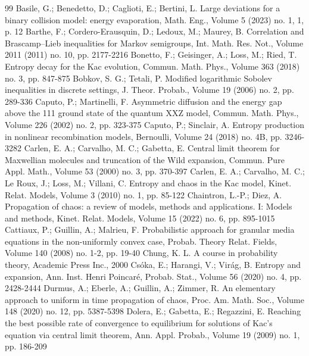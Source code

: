 \documentclass[10pt,a4paper]{article}
\begin{document}
\begin{thebibliography}{99}
 Basile, G.; Benedetto, D.; Caglioti, E.; Bertini, L. Large deviations for a binary collision model: energy evaporation, Math. Eng., Volume 5 (2023) no. 1, 1, p. 12
 Barthe, F.; Cordero-Erausquin, D.; Ledoux, M.; Maurey, B. Correlation and Brascamp–Lieb inequalities for Markov semigroups, Int. Math. Res. Not., Volume 2011 (2011) no. 10, pp. 2177-2216
 Bonetto, F.; Geisinger, A.; Loss, M.; Ried, T. Entropy decay for the Kac evolution, Commun. Math. Phys., Volume 363 (2018) no. 3, pp. 847-875
 Bobkov, S. G.; Tetali, P. Modified logarithmic Sobolev inequalities in discrete settings, J. Theor. Probab., Volume 19 (2006) no. 2, pp. 289-336
 Caputo, P.; Martinelli, F. Asymmetric diffusion and the energy gap above the 111 ground state of the quantum XXZ model, Commun. Math. Phys., Volume 226 (2002) no. 2, pp. 323-375
 Caputo, P.; Sinclair, A. Entropy production in nonlinear recombination models, Bernoulli, Volume 24 (2018) no. 4B, pp. 3246-3282
 Carlen, E. A.; Carvalho, M. C.; Gabetta, E. Central limit theorem for Maxwellian molecules and truncation of the Wild expansion, Commun. Pure Appl. Math., Volume 53 (2000) no. 3, pp. 370-397
 Carlen, E. A.; Carvalho, M. C.; Le Roux, J.; Loss, M.; Villani, C. Entropy and chaos in the Kac model, Kinet. Relat. Models, Volume 3 (2010) no. 1, pp. 85-122
 Chaintron, L.-P.; Diez, A. Propagation of chaos: a review of models, methods and applications. I: Models and methods, Kinet. Relat. Models, Volume 15 (2022) no. 6, pp. 895-1015
 Cattiaux, P.; Guillin, A.; Malrieu, F. Probabilistic approach for granular media equations in the non-uniformly convex case, Probab. Theory Relat. Fields, Volume 140 (2008) no. 1-2, pp. 19-40
 Chung, K. L. A course in probability theory, Academic Press Inc., 2000
 Csóka, E.; Harangi, V.; Virág, B. Entropy and expansion, Ann. Inst. Henri Poincaré, Probab. Stat., Volume 56 (2020) no. 4, pp. 2428-2444
 Durmus, A.; Eberle, A.; Guillin, A.; Zimmer, R. An elementary approach to uniform in time propagation of chaos, Proc. Am. Math. Soc., Volume 148 (2020) no. 12, pp. 5387-5398
 Dolera, E.; Gabetta, E.; Regazzini, E. Reaching the best possible rate of convergence to equilibrium for solutions of Kac’s equation via central limit theorem, Ann. Appl. Probab., Volume 19 (2009) no. 1, pp. 186-209

\end{thebibliography}
\end{document}
